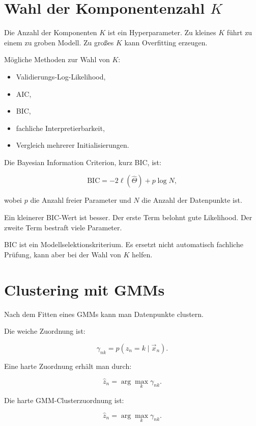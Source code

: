 \section{Wahl der Komponentenzahl \(K\)}

Die Anzahl der Komponenten \(K\) ist ein Hyperparameter.
Zu kleines \(K\) führt zu einem zu groben Modell.
Zu großes \(K\) kann Overfitting erzeugen.

Mögliche Methoden zur Wahl von \(K\):

\begin{itemize}
    \item Validierungs-Log-Likelihood,
    \item AIC,
    \item BIC,
    \item fachliche Interpretierbarkeit,
    \item Vergleich mehrerer Initialisierungen.
\end{itemize}

\begin{definitionbox}
Die Bayesian Information Criterion, kurz BIC, ist:

\[
    \mathrm{BIC}
    =
    -2\ell(\hat{\Theta})
    +
    p\log N,
\]

wobei \(p\) die Anzahl freier Parameter und \(N\) die Anzahl der Datenpunkte ist.
\end{definitionbox}

Ein kleinerer BIC-Wert ist besser.
Der erste Term belohnt gute Likelihood.
Der zweite Term bestraft viele Parameter.

\begin{notebox}
BIC ist ein Modellselektionskriterium.
Es ersetzt nicht automatisch fachliche Prüfung, kann aber bei der Wahl von \(K\) helfen.
\end{notebox}

\section{Clustering mit GMMs}

Nach dem Fitten eines GMMs kann man Datenpunkte clustern.

Die weiche Zuordnung ist:

\[
    \gamma_{nk}
    =
    p(z_n=k\mid\vec{x}_n).
\]

Eine harte Zuordnung erhält man durch:

\[
    \hat{z}_n
    =
    \arg\max_k
    \gamma_{nk}.
\]

\begin{definitionbox}
Die harte GMM-Clusterzuordnung ist:

\[
    \hat{z}_n
    =
    \arg\max_k
    \gamma_{nk}.
\]
\end{definitionbox}

